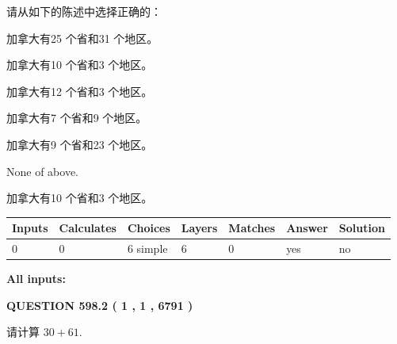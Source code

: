 \documentclass{ctexart}
\begin{document}
  
请从如下的陈述中选择正确的：
 
 
加拿大有25 个省和31 个地区。
 
 
加拿大有10 个省和3 个地区。
 
 
加拿大有12 个省和3 个地区。
 
 
加拿大有7 个省和9 个地区。
 
 
加拿大有9 个省和23 个地区。
 
 
 None of above.
 
 
\noindent{}
 
 
加拿大有10 个省和3 个地区。
 
 
\noindent{}
 
 
   
   
   
   
\noindent\begin{tabular}{|l|l|l|l|l|l|l|}
 \hline
Inputs & Calculates & Choices & Layers & Matches & Answer & Solution \\ \hline
 0  & 
 0  & 
 6
  simple  
  & 
 6  & 
 0  & 
  yes & 
  no 
  \\ \hline
 \end{tabular}
   
   
   
   
\noindent{}
   
   
   
   
\noindent\vspace{0.1in}\hspace{-0.08in} {\textbf{\Large{All inputs: }}}
   
   
  
\vspace{0.2in}
  
{\textbf{\Large{QUESTION
598.2 
 ( 1 , 1 , 6791 )
}}}
  
  
 
请计算 $ %
30 +  %
61 $.
 
 
 
\noindent{}
 
\end{document}
